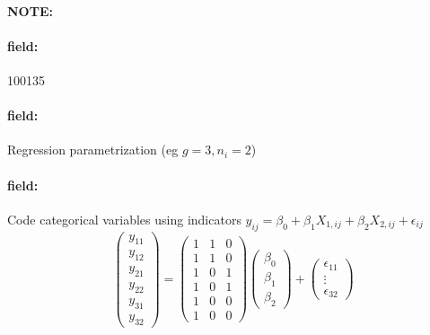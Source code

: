 \documentclass[12pt]{article}
\newenvironment{note}{\paragraph{NOTE:}}{}
\newenvironment{field}{\paragraph{field:}}{}
\begin{document}
\begin{note}
 \begin{field}
  \tiny 100135
 \end{field}
 \begin{field}
  Regression parametrization (eg $g = 3, n_i = 2$)
 \end{field}
 \begin{field}
  Code categorical variables using indicators
  $y_{ij} = \beta_0 + \beta_1X_{1,ij} + \beta_2X_{2,ij} + \epsilon_{ij}$
  $$ \begin{pmatrix}
    y_{11} \\ y_{12} \\ y_{21} \\ y_{22} \\ y_{31} \\y_{32}
   \end{pmatrix}  = \begin{pmatrix}
    1 & 1 & 0 \\
    1 & 1 & 0 \\
    1 & 0 & 1 \\
    1 & 0 & 1 \\
    1 & 0 & 0 \\
    1 & 0 & 0
   \end{pmatrix} \begin{pmatrix}
    \beta_0 \\ \beta_1 \\ \beta_2
   \end{pmatrix} + \begin{pmatrix}
    \epsilon_{11} \\ \vdots \\ \epsilon_{32}
   \end{pmatrix}$$
 \end{field}
\end{note}
\end{document}
